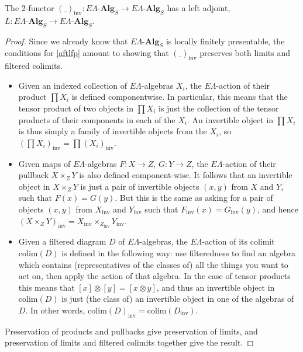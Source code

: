 \documentclass{amsbook} %
\newcommand{\mb}{\mathbf}
\numberwithin{section}{chapter}
\begin{document}
\begin{prop} \label{invadj} The 2-functor $(\_)_{\mathrm{inv}}: E\Lambda\mbox{-}\mb{Alg}_S \to E\Lambda\mbox{-}\mb{Alg}_S$ has a left adjoint, $L: E\Lambda\mbox{-}\mb{Alg}_S \to E\Lambda\mbox{-}\mb{Alg}_S$.
\end{prop}
\begin{proof} Since we already know that $E\Lambda\mbox{-}\mb{Alg}_S$ is locally finitely presentable, the conditions for \cref{aftlfp} amount to showing that $(\_)_{\mathrm{inv}}$ preserves both limits and filtered colimits.
\begin{itemize}
\item Given an indexed collection of $E\Lambda$-algebras $X_i$, the $E\Lambda$-action of their product $\prod X_i$ is defined componentwise. In particular, this means that the tensor product of two objects in $\prod X_i$ is just the collection of the tensor products of their components in each of the $X_i$. An invertible object in $\prod X_i$ is thus simply a family of invertible objects from the $X_i$, so $(\prod X_i)_{\mathrm{inv}} = \prod (X_i)_{\mathrm{inv}}$.
\item Given maps of $E\Lambda$-algebras $F: X \to Z$, $G : Y \to Z$, the $E\Lambda$-action of their pullback $X \times_Z Y$ is also defined component-wise. It follows that an invertible object in $X \times_Z Y$ is just a pair of invertible objects $(x, y)$ from $X$ and $Y$, such that $F(x) = G(y)$. But this is the same as asking for a pair of objects $(x, y)$ from $X_{\mathrm{inv}}$ and $Y_{\mathrm{inv}}$ such that $F_{\mathrm{inv}}(x) = G_{\mathrm{inv}}(y)$, and hence $(X \times_Z Y)_{\mathrm{inv}} = X_{\mathrm{inv}} \times_{Z_{\mathrm{inv}}} Y_{\mathrm{inv}}$.
\item Given a filtered diagram $D$ of $E\Lambda$-algebras, the $E\Lambda$-action of its colimit $\mathrm{colim}(D)$ is defined in the following way: use filteredness to find an algebra which contains (representatives of the classes of) all the things you want to act on, then apply the action of that algebra. In the case of tensor products this means that $[x]\otimes[y] = [x \otimes y]$, and thus an invertible object in $\mathrm{colim}(D)$ is just (the class of) an invertible object in one of the algebras of $D$. In other words, $\mathrm{colim}(D)_{\mathrm{inv}} = \mathrm{colim}(D_{\mathrm{inv}})$.
\end{itemize}
Preservation of products and pullbacks give preservation of limits, and preservation of limits and filtered colimits together give the result.
\end{proof}
\end{document}
